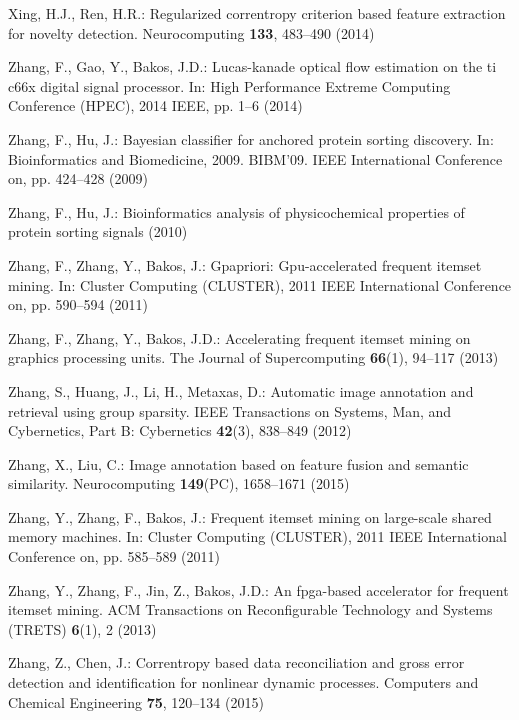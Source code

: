 \documentclass[runningheads,a4paper]{llncs}
\begin{document}
\begin{thebibliography}{10}
Xing, H.J., Ren, H.R.: Regularized correntropy criterion based feature
  extraction for novelty detection.
\newblock Neurocomputing \textbf{133}, 483--490 (2014)

Zhang, F., Gao, Y., Bakos, J.D.: Lucas-kanade optical flow estimation on the ti
  c66x digital signal processor.
\newblock In: High Performance Extreme Computing Conference (HPEC), 2014 IEEE,
  pp. 1--6 (2014)

Zhang, F., Hu, J.: Bayesian classifier for anchored protein sorting discovery.
\newblock In: Bioinformatics and Biomedicine, 2009. BIBM'09. IEEE International
  Conference on, pp. 424--428 (2009)

Zhang, F., Hu, J.: Bioinformatics analysis of physicochemical properties of
  protein sorting signals  (2010)

Zhang, F., Zhang, Y., Bakos, J.: Gpapriori: Gpu-accelerated frequent itemset
  mining.
\newblock In: Cluster Computing (CLUSTER), 2011 IEEE International Conference
  on, pp. 590--594 (2011)

Zhang, F., Zhang, Y., Bakos, J.D.: Accelerating frequent itemset mining on
  graphics processing units.
\newblock The Journal of Supercomputing \textbf{66}(1), 94--117 (2013)

Zhang, S., Huang, J., Li, H., Metaxas, D.: Automatic image annotation and
  retrieval using group sparsity.
\newblock IEEE Transactions on Systems, Man, and Cybernetics, Part B:
  Cybernetics \textbf{42}(3), 838--849 (2012)

Zhang, X., Liu, C.: Image annotation based on feature fusion and semantic
  similarity.
\newblock Neurocomputing \textbf{149}(PC), 1658--1671 (2015)

Zhang, Y., Zhang, F., Bakos, J.: Frequent itemset mining on large-scale shared
  memory machines.
\newblock In: Cluster Computing (CLUSTER), 2011 IEEE International Conference
  on, pp. 585--589 (2011)

Zhang, Y., Zhang, F., Jin, Z., Bakos, J.D.: An fpga-based accelerator for
  frequent itemset mining.
\newblock ACM Transactions on Reconfigurable Technology and Systems (TRETS)
  \textbf{6}(1), 2 (2013)

Zhang, Z., Chen, J.: Correntropy based data reconciliation and gross error
  detection and identification for nonlinear dynamic processes.
\newblock Computers and Chemical Engineering \textbf{75}, 120--134 (2015)


\end{thebibliography}
\end{document}
